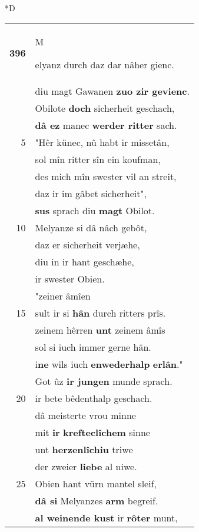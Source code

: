 \documentclass[8pt,a4paper,notitlepage]{article}
\begin{document}
\begin{table}[ht]
\begin{minipage}[t]{0.5\linewidth}
\small
\begin{center}*D
\end{center}
\begin{tabular}{rl}
\textbf{396} & \begin{large}M\end{large}elyanz durch daz dar nâher gienc.\\ 
 & diu magt Gawanen \textbf{zuo zir gevienc}.\\ 
 & Obilote \textbf{doch} sicherheit geschach,\\ 
 & \textbf{dâ ez} manec \textbf{werder ritter} sach.\\ 
5 & "Hêr künec, nû habt ir missetân,\\ 
 & sol mîn ritter sîn ein koufman,\\ 
 & des mich mîn swester vil an streit,\\ 
 & daz ir im gâbet sicherheit",\\ 
 & \textbf{sus} sprach diu \textbf{magt} Obilot.\\ 
10 & Melyanze si dâ nâch gebôt,\\ 
 & daz er sicherheit verjæhe,\\ 
 & diu in ir hant geschæhe,\\ 
 & ir swester Obien.\\ 
 & "zeiner âmîen\\ 
15 & sult ir si \textbf{hân} durch ritters prîs.\\ 
 & zeinem hêrren \textbf{unt} zeinem âmîs\\ 
 & sol si iuch immer gerne hân.\\ 
 & i\textbf{ne} wils iuch \textbf{enwederhalp} \textbf{erlân}."\\ 
 & Got ûz \textbf{ir jungen} munde sprach.\\ 
20 & ir bete bêdenthalp geschach.\\ 
 & dâ meisterte vrou minne\\ 
 & mit \textbf{ir} \textbf{krefteclîchem} sinne\\ 
 & unt \textbf{herzenlîchiu} triwe\\ 
 & der zweier \textbf{liebe} al niwe.\\ 
25 & Obien hant vürn mantel sleif,\\ 
 & \textbf{dâ si} Melyanzes \textbf{arm} begreif.\\ 
 & \textbf{al weinende kust} ir \textbf{rôter} munt,\\ 

\end{tabular}
\end{minipage}
\end{table}
\end{document}

